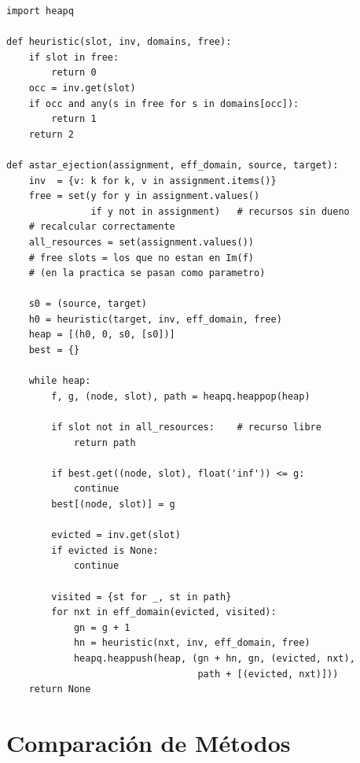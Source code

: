 \documentclass[12pt, a4paper]{article}
\theoremstyle{definition}
\theoremstyle{plain}
\theoremstyle{remark}
\begin{document}
\begin{lstlisting}[caption={Implementación A* en Python}]
import heapq

def heuristic(slot, inv, domains, free):
    if slot in free:
        return 0
    occ = inv.get(slot)
    if occ and any(s in free for s in domains[occ]):
        return 1
    return 2

def astar_ejection(assignment, eff_domain, source, target):
    inv  = {v: k for k, v in assignment.items()}
    free = set(y for y in assignment.values()
               if y not in assignment)   # recursos sin dueno
    # recalcular correctamente
    all_resources = set(assignment.values())
    # free slots = los que no estan en Im(f)
    # (en la practica se pasan como parametro)

    s0 = (source, target)
    h0 = heuristic(target, inv, eff_domain, free)
    heap = [(h0, 0, s0, [s0])]
    best = {}

    while heap:
        f, g, (node, slot), path = heapq.heappop(heap)

        if slot not in all_resources:    # recurso libre
            return path

        if best.get((node, slot), float('inf')) <= g:
            continue
        best[(node, slot)] = g

        evicted = inv.get(slot)
        if evicted is None:
            continue

        visited = {st for _, st in path}
        for nxt in eff_domain(evicted, visited):
            gn = g + 1
            hn = heuristic(nxt, inv, eff_domain, free)
            heapq.heappush(heap, (gn + hn, gn, (evicted, nxt),
                                  path + [(evicted, nxt)]))
    return None
\end{lstlisting}

\section{Comparación de Métodos}
\end{document}
